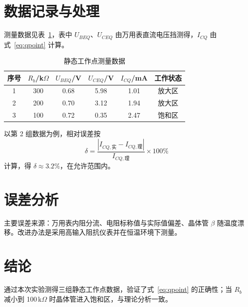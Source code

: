 \documentclass[UTF8,a4paper,zihao=-4,fontset=\swfontset]{ctexart}
\begin{document}
\section{数据记录与处理}

测量数据见表~\ref{tab:data}，表中 $U_{BEQ}$、$U_{CEQ}$ 由万用表直流电压挡测得，$I_{CQ}$ 由式~\eqref{eq:qpoint} 计算。

\begin{table}[htbp]
  \centering
  \caption{静态工作点测量数据}
  \label{tab:data}
  \begin{tabular}{cccccc}
    \toprule
    序号 & $R_{b}$/k$\Omega$ & $U_{BEQ}$/V & $U_{CEQ}$/V & $I_{CQ}$/mA & 工作状态 \\
    \midrule
    1 & 300 & 0.68 & 5.98 & 1.01 & 放大区 \\
    2 & 200 & 0.70 & 3.12 & 1.94 & 放大区 \\
    3 & 100 & 0.72 & 0.35 & 2.47 & 饱和区 \\
    \bottomrule
  \end{tabular}
\end{table}

以第 2 组数据为例，相对误差按
\begin{equation}
  \delta=\frac{\left|I_{CQ,\text{实}}-I_{CQ,\text{理}}\right|}{I_{CQ,\text{理}}}\times100\%
  \label{eq:error}
\end{equation}
计算，得 $\delta\approx 3.2\%$，在允许范围内。

\section{误差分析}

主要误差来源：万用表内阻分流、电阻标称值与实际值偏差、晶体管 $\beta$ 随温度漂移。改进办法是采用高输入阻抗仪表并在恒温环境下测量。

\section{结论}

通过本次实验测得三组静态工作点数据，验证了式~\eqref{eq:qpoint} 的正确性；当 $R_{b}$ 减小到 100\,k$\Omega$ 时晶体管进入饱和区，与理论分析一致\cite{zhang2024demo}。



\end{document}
